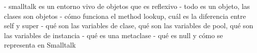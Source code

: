 - smalltalk es un entorno vivo de objetos que es reflexivo
- todo es un objeto, las clases son objetos
- cómo funciona el method lookup, cuál es la diferencia entre self y super
- qué son las variables de clase, qué son las variables de pool, qué son las variables de instancia
- qué es una metaclase
- qué es null y cómo se representa en Smalltalk